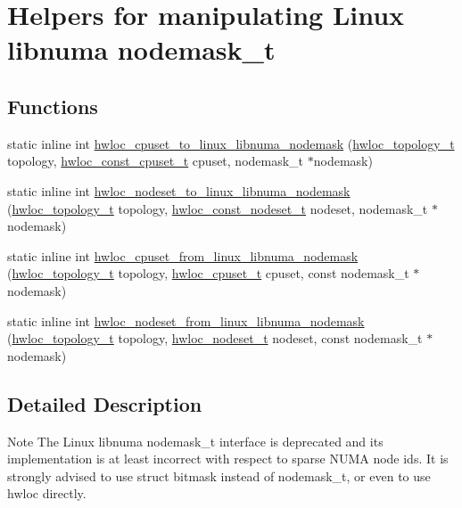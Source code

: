 \hypertarget{a00070}{
\section{Helpers for manipulating Linux libnuma nodemask\_\-t}
\label{a00070}
}
\subsection*{Functions}
\begin{DoxyCompactItemize}
\item 
static inline int \hyperlink{a00070_ga36feb81315de87ce11d9a5aa2b4c6e6d}{hwloc\_\-cpuset\_\-to\_\-linux\_\-libnuma\_\-nodemask} (\hyperlink{a00039_ga9d1e76ee15a7dee158b786c30b6a6e38}{hwloc\_\-topology\_\-t} topology, \hyperlink{a00040_ga1f784433e9b606261f62d1134f6a3b25}{hwloc\_\-const\_\-cpuset\_\-t} cpuset, nodemask\_\-t $\ast$nodemask)
\item 
static inline int \hyperlink{a00070_gafa4e7cc68f0f99724f8d99541d9ab3de}{hwloc\_\-nodeset\_\-to\_\-linux\_\-libnuma\_\-nodemask} (\hyperlink{a00039_ga9d1e76ee15a7dee158b786c30b6a6e38}{hwloc\_\-topology\_\-t} topology, \hyperlink{a00040_ga2f5276235841ad66a79bedad16a5a10c}{hwloc\_\-const\_\-nodeset\_\-t} nodeset, nodemask\_\-t $\ast$nodemask)
\item 
static inline int \hyperlink{a00070_gac24c9e4bb2eab3e23b2039559adc9df8}{hwloc\_\-cpuset\_\-from\_\-linux\_\-libnuma\_\-nodemask} (\hyperlink{a00039_ga9d1e76ee15a7dee158b786c30b6a6e38}{hwloc\_\-topology\_\-t} topology, \hyperlink{a00040_ga4bbf39b68b6f568fb92739e7c0ea7801}{hwloc\_\-cpuset\_\-t} cpuset, const nodemask\_\-t $\ast$nodemask)
\item 
static inline int \hyperlink{a00070_ga22862f485346ae3b2ab7d052f538fc5f}{hwloc\_\-nodeset\_\-from\_\-linux\_\-libnuma\_\-nodemask} (\hyperlink{a00039_ga9d1e76ee15a7dee158b786c30b6a6e38}{hwloc\_\-topology\_\-t} topology, \hyperlink{a00040_ga37e35730fa7e775b5bb0afe893d6d508}{hwloc\_\-nodeset\_\-t} nodeset, const nodemask\_\-t $\ast$nodemask)
\end{DoxyCompactItemize}


\subsection{Detailed Description}
\begin{DoxyNote}{Note}
The Linux libnuma nodemask\_\-t interface is deprecated and its implementation is at least incorrect with respect to sparse NUMA node ids. It is strongly advised to use struct bitmask instead of nodemask\_\-t, or even to use hwloc directly. 
\end{DoxyNote}



